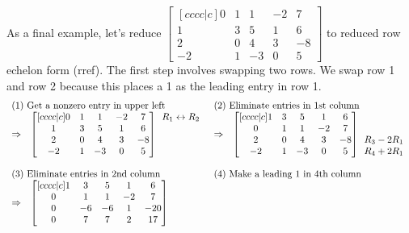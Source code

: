 \begin{example}\label{ex rref last}
As a final example, let's reduce 
{\small $
\begin{bmatrix}[cccc|c]
 0 & 1 & 1 & -2 & 7 \\
  1 & 3 & 5 & 1 & 6 \\
 2 & 0 & 4 & 3 & -8 \\
 -2 & 1 & -3 & 0 & 5
\end{bmatrix}
$} to reduced row echelon form (rref). The first step involves swapping two rows. We swap row 1 and row 2 because this places a 1 as the leading entry in row 1.
{\small  $$\begin{array}{rlcl}
\multicolumn{2}{l}{\text{(1) Get a nonzero entry in upper left}}&
\multicolumn{2}{l}{\text{(2) Eliminate entries in 1st column}}\\
\Rightarrow&
\begin{bmatrix}[cccc|c]
 0 & 1 & 1 & -2 & 7 \\
  1 & 3 & 5 & 1 & 6 \\
 2 & 0 & 4 & 3 & -8 \\
 -2 & 1 & -3 & 0 & 5
\end{bmatrix}
  \begin{array}{lr} R_1\leftrightarrow R_2 \\ \ \\ \ \\ \ \end{array}
&\Rightarrow& 
\begin{bmatrix}[cccc|c]
  1 & 3 & 5 & 1 & 6 \\
 0 & 1 & 1 & -2 & 7 \\
 2 & 0 & 4 & 3 & -8 \\
 -2 & 1 & -3 & 0 & 5
\end{bmatrix}
  \begin{array}{lr} \ \\ \ \\ R_3-2R_1 \\ R_4+2R_1 \end{array}
\\ \\
\multicolumn{2}{l}{\text{(3) Eliminate entries in 2nd column}}&
\multicolumn{2}{l}{\text{(4) Make a leading 1 in 4th column}}\\
\Rightarrow&
\begin{bmatrix}[cccc|c]
  1 & 3 & 5 & 1 & 6 \\
 0 & 1 & 1 & -2 & 7 \\
 0 & -6 & -6 & 1 & -20 \\
 0 & 7 & 7 & 2 & 17

\end{bmatrix}
\end{array}$$}
\end{example}
